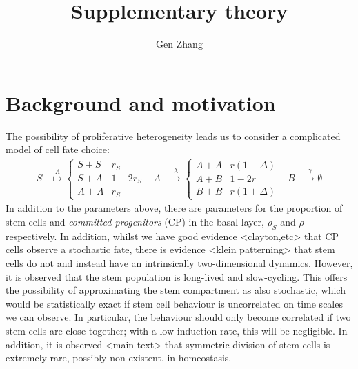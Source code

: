 \documentclass[10pt,UKenglish]{article}
\begin{document}
\title{Supplementary theory}
\author{Gen Zhang}
 
\maketitle

\renewcommand{\thesection}{S-\Roman{section}}

\section{\label{sec:introduction}Background and motivation}

The possibility of proliferative heterogeneity leads us to consider a complicated model of cell fate choice: 
\begin{align}
S &\overset{\Lambda}{\longmapsto} \begin{cases}
S+S & r_S \\
S+A & 1-2r_S \\
A+A & r_S\end{cases} & A &\overset{\lambda}{\longmapsto} \begin{cases}
A+A & r(1-\Delta) \\
A+B & 1-2r \\
B+B & r(1+\Delta)\end{cases} & B &\overset{\gamma}{\longmapsto} \emptyset
\label{eq:really-full-model}
\end{align}
In addition to the parameters above, there are parameters for the proportion of stem cells and \emph{committed progenitors} (CP) in the basal layer, $\rho_S$ and $\rho$ respectively. In addition, whilst we have good evidence <clayton,etc> that CP cells observe a stochastic fate, there is evidence <klein patterning> that stem cells do not and instead have an intrinsically two-dimensional dynamics. However, it is observed that the stem population is long-lived and slow-cycling. This offers the possibility of approximating the stem compartment as also stochastic, which would be statistically exact if stem cell behaviour is uncorrelated on time scales we can observe. In particular, the behaviour should only become correlated if two stem cells are close together; with a low induction rate, this will be negligible. In addition, it is observed <main text> that symmetric division of stem cells is extremely rare, possibly non-existent, in homeostasis.
\end{document}
